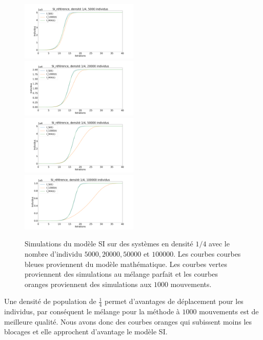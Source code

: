 \begin{figure}
    \centering
    \captionsetup{justification=centering}
    \includegraphics[width=0.5\textwidth]{Images/SI_ref_4_5k.pdf}
    \includegraphics[width=0.5\textwidth]{Images/SI_ref_4_20k.pdf}
    \includegraphics[width=0.5\textwidth]{Images/SI_ref_4_50k.pdf}
    \includegraphics[width=0.5\textwidth]{Images/SI_ref_4_100k.pdf}
    \caption[Simulations de SI, densité 1/4]{Simulations du modèle SI sur des systèmes en densité $1/4$ avec le nombre d'individu $5000,20000,50000$ et $100000$. Les courbes courbes bleues proviennent du modèle mathématique. Les courbes vertes proviennent des simulations au mélange parfait et les courbes oranges proviennent des simulations aux $1000$ mouvements.}
\end{figure}

Une densité de population de $\frac{1}{4}$ permet d'avantages de déplacement pour les individus, par conséquent le mélange pour la méthode à $1000$ mouvements est de meilleure qualité. Nous avons donc des courbes oranges qui subissent moins les blocages et elle approchent d'avantage le modèle SI.\\

